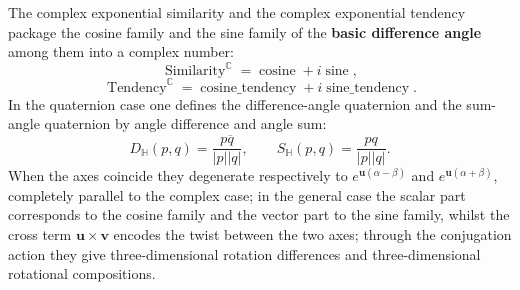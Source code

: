 \begin{remark}\label{rem:exponential_similarity_relation_to_12}
The complex exponential similarity and the complex exponential tendency package the cosine family and the sine family of the \textbf{basic difference angle} among them into a complex number:
\[
\operatorname{Similarity}^{\mathbb C}
=
\operatorname{cosine}
+
i\operatorname{sine},
\]
\[
\operatorname{Tendency}^{\mathbb C}
=
\operatorname{cosine\_tendency}
+
i\operatorname{sine\_tendency}.
\]
In the quaternion case one defines the difference-angle quaternion and the sum-angle quaternion by angle difference and angle sum:
\[
D_{\mathbb H}(p,q)=\frac{p\overline q}{|p||q|},\qquad
S_{\mathbb H}(p,q)=\frac{pq}{|p||q|}.
\]
When the axes coincide they degenerate respectively to $e^{\mathbf u(\alpha-\beta)}$ and $e^{\mathbf u(\alpha+\beta)}$, completely parallel to the complex case; in the general case the scalar part corresponds to the cosine family and the vector part to the sine family, whilst the cross term $\mathbf u\times\mathbf v$ encodes the twist between the two axes; through the conjugation action they give three-dimensional rotation differences and three-dimensional rotational compositions.
\end{remark}

